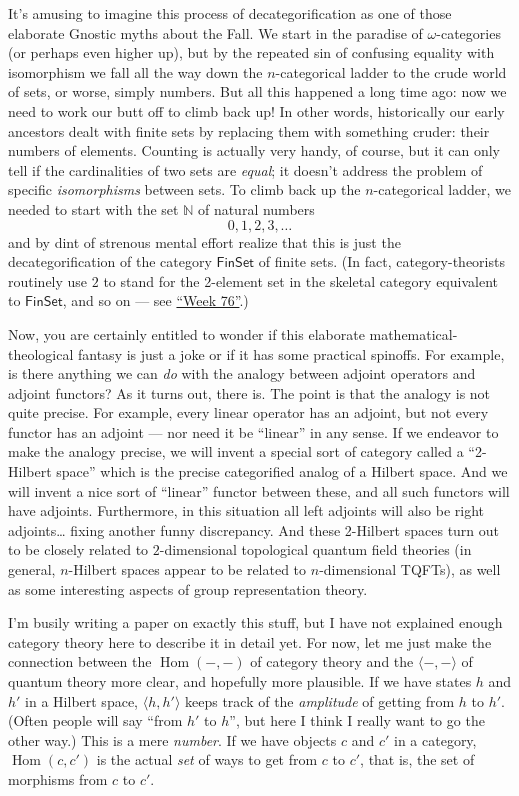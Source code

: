 \documentclass{article}
\begin{document}
It's amusing to imagine this process of decategorification as one of
those elaborate Gnostic myths about the Fall. We start in the paradise
of \(\omega\)-categories (or perhaps even higher up), but by the
repeated sin of confusing equality with isomorphism we fall all the way
down the \(n\)-categorical ladder to the crude world of sets, or worse,
simply numbers. But all this happened a long time ago: now we need to
work our butt off to climb back up! In other words, historically our
early ancestors dealt with finite sets by replacing them with something
cruder: their numbers of elements. Counting is actually very handy, of
course, but it can only tell if the cardinalities of two sets are
\emph{equal}; it doesn't address the problem of specific
\emph{isomorphisms} between sets. To climb back up the \(n\)-categorical
ladder, we needed to start with the set \(\mathbb{N}\) of natural
numbers \[0, 1, 2, 3, \ldots\] and by dint of strenous mental effort
realize that this is just the decategorification of the category
\(\mathsf{FinSet}\) of finite sets. (In fact, category-theorists
routinely use \(2\) to stand for the 2-element set in the skeletal
category equivalent to \(\mathsf{FinSet}\), and so on --- see
\protect\hyperlink{week76}{``Week 76''}.)

Now, you are certainly entitled to wonder if this elaborate
mathematical-theological fantasy is just a joke or if it has some
practical spinoffs. For example, is there anything we can \emph{do} with
the analogy between adjoint operators and adjoint functors? As it turns
out, there is. The point is that the analogy is not quite precise. For
example, every linear operator has an adjoint, but not every functor has
an adjoint --- nor need it be ``linear'' in any sense. If we endeavor to
make the analogy precise, we will invent a special sort of category
called a ``2-Hilbert space'' which is the precise categorified analog of
a Hilbert space. And we will invent a nice sort of ``linear'' functor
between these, and all such functors will have adjoints. Furthermore, in
this situation all left adjoints will also be right adjoints\ldots{}
fixing another funny discrepancy. And these 2-Hilbert spaces turn out to
be closely related to \(2\)-dimensional topological quantum field
theories (in general, \(n\)-Hilbert spaces appear to be related to
\(n\)-dimensional TQFTs), as well as some interesting aspects of group
representation theory.

I'm busily writing a paper on exactly this stuff, but I have not
explained enough category theory here to describe it in detail yet. For
now, let me just make the connection between the
\(\operatorname{Hom}(-,-)\) of category theory and the
\(\langle -,-\rangle\) of quantum theory more clear, and hopefully more
plausible. If we have states \(h\) and \(h'\) in a Hilbert space,
\(\langle h,h'\rangle\) keeps track of the \emph{amplitude} of getting
from \(h\) to \(h'\). (Often people will say ``from \(h'\) to \(h\)'',
but here I think I really want to go the other way.) This is a mere
\emph{number}. If we have objects \(c\) and \(c'\) in a category,
\(\operatorname{Hom}(c,c')\) is the actual \emph{set} of ways to get
from \(c\) to \(c'\), that is, the set of morphisms from \(c\) to
\(c'\).
\end{document}
